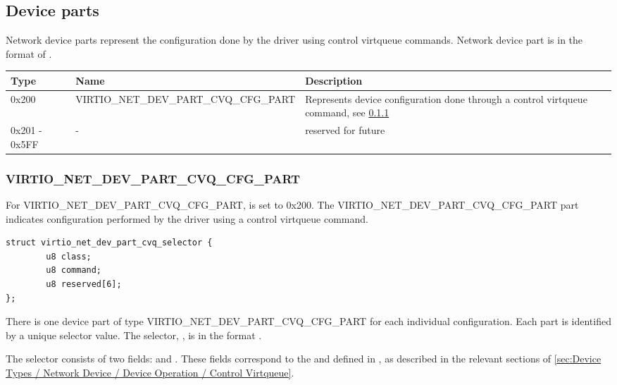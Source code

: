 \subsection{Device parts}\label{sec:Device Types / Network Device / Device parts}

Network device parts represent the configuration done by the driver using control
virtqueue commands. Network device part is in the format of
.

\begin{tabularx}{\textwidth}{ |l||l|X| }
\hline
Type & Name & Description \\
\hline \hline
0x200 & VIRTIO_NET_DEV_PART_CVQ_CFG_PART & Represents device configuration done through a control virtqueue command, see \ref{sec:Device Types / Network Device / Device parts / VIRTIO-NET-DEV-PART-CVQ-CFG-PART} \\
\hline
0x201 - 0x5FF & - & reserved for future \\
\hline
\hline
\end{tabularx}

\subsubsection{VIRTIO_NET_DEV_PART_CVQ_CFG_PART}\label{sec:Device Types / Network Device / Device parts / VIRTIO-NET-DEV-PART-CVQ-CFG-PART}

For VIRTIO_NET_DEV_PART_CVQ_CFG_PART,  is set to 0x200. The
VIRTIO_NET_DEV_PART_CVQ_CFG_PART part indicates configuration performed by the
driver using a control virtqueue command.

\begin{lstlisting}
struct virtio_net_dev_part_cvq_selector {
        u8 class;
        u8 command;
        u8 reserved[6];
};
\end{lstlisting}

There is one device part of type VIRTIO_NET_DEV_PART_CVQ_CFG_PART for each
individual configuration. Each part is identified by a unique selector value.
The selector, , is in the format
.

The selector consists of two fields:  and . These
fields correspond to the  and  defined in
, as described in the relevant sections of
\ref{sec:Device Types / Network Device / Device Operation / Control Virtqueue}.

